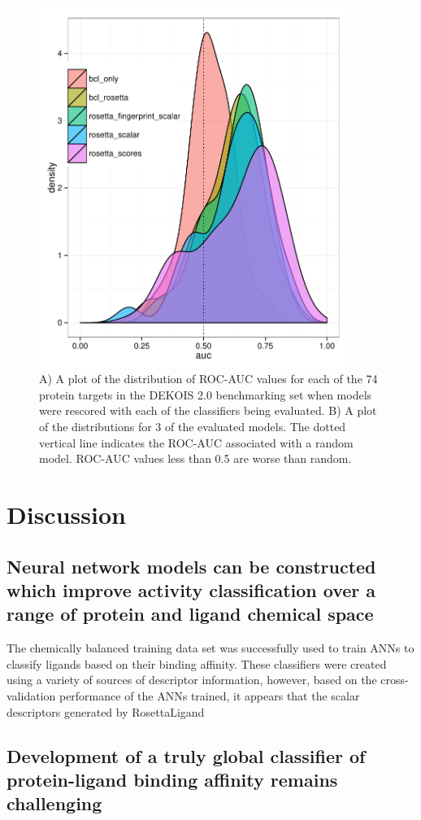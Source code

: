 \begin{figure}
\centering
\includegraphics[width=4in]{figures/hts/dekois_screen_all.pdf}
\caption{
A) A plot of the distribution of ROC-AUC values for each of the 74 protein targets in the DEKOIS 2.0 benchmarking set when models were rescored with each of the classifiers being evaluated.
B) A plot of the distributions for 3 of the evaluated models.
The dotted vertical line indicates the ROC-AUC associated with a random model.
ROC-AUC values less than 0.5 are worse than random. 
}
\label{fig:dekois_roc_all}
\end{figure}

\section{Discussion}

\subsection{Neural network models can be constructed which improve activity classification over a range of protein and ligand chemical space}

The chemically balanced training data set was successfully used to train ANNs to classify ligands based on their binding affinity.
These classifiers were created using a variety of sources of descriptor information, however, based on the cross-validation performance of the ANNs trained, it appears that the scalar descriptors generated by RosettaLigand 

\subsection{Development of a truly global classifier of protein-ligand binding affinity remains challenging}